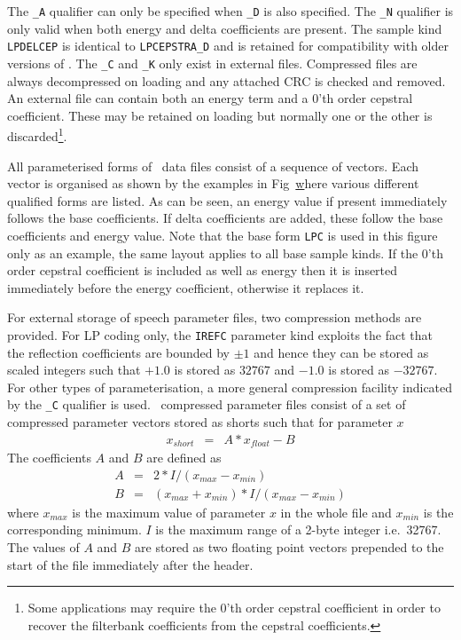 The \texttt{\_A} qualifier can only be specified when \texttt{\_D}
is also specified.
The \texttt{\_N} qualifier is only valid when both energy and delta
coefficients are present.  
The sample kind \texttt{LPDELCEP} is identical to \texttt{LPCEPSTRA\_D}
and is retained for compatibility with older versions of \HTK.
The \texttt{\_C} and 
\texttt{\_K} only exist in external files.  Compressed
files are always decompressed on loading and any attached CRC 
is checked and removed.  An external file can contain both an energy
term and a 0'th order cepstral coefficient.  These may be retained
on loading but normally one or the other is discarded\footnote{
Some applications may require the 0'th order cepstral coefficient
in order to recover the filterbank coefficients from the cepstral
coefficients.}.


All parameterised forms of \HTK\ data files consist of a sequence of vectors.
Each vector is organised as shown by the examples in Fig~\href{f:HTKFormat}
where various different qualified forms are listed.  As can be seen, an energy
value if present immediately follows the base coefficients.  If delta
coefficients are added, these follow the base coefficients and energy value.
Note that the base form \texttt{LPC} is used in this figure only as an example,
the same layout applies to all base sample kinds.  If the 0'th order cepstral
coefficient is included as well as energy then it is inserted immediately
before the energy coefficient, otherwise it replaces it.

For external storage of speech parameter files, two compression methods are
provided.  For LP coding only, the \texttt{IREFC} parameter kind exploits the
fact that the reflection coefficients are bounded by $\pm 1$ and hence they can
be stored as scaled integers such that $+1.0$ is stored as $32767$ and $-1.0$
is stored as $-32767$.  For other types of parameterisation, a more general
compression facility indicated by the
\texttt{\_C} qualifier is used.  
\HTK\ compressed parameter files consist of a set of compressed parameter 
vectors stored as shorts such that for parameter $x$
\begin{eqnarray}
x_{short} & = & A*x_{float}-B  \nonumber   
\end{eqnarray}
The coefficients $A$ and $B$ are defined as
\begin{eqnarray}
A & = & 2*I/(x_{max}-x_{min}) \nonumber\\
B & = & (x_{max}+x_{min})*I/(x_{max}-x_{min}) \nonumber
\end{eqnarray}
where $x_{max}$ is the maximum value of parameter $x$ in the whole file and
$x_{min}$ is the corresponding minimum. $I$ is the maximum range of a 2-byte
integer i.e.\ 32767.  The values of $A$ and $B$ are stored as two floating
point vectors prepended to the start of the file immediately after the header.

